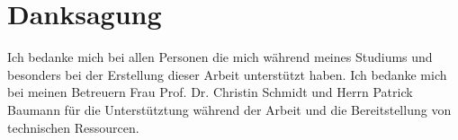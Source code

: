 \chapter*{Danksagung}
Ich bedanke mich bei allen Personen die mich während meines Studiums und besonders bei der Erstellung dieser Arbeit unterstützt haben.
Ich bedanke mich bei meinen Betreuern Frau Prof. Dr. Christin Schmidt und Herrn Patrick Baumann für die Unterstütztung während der Arbeit und
die Bereitstellung von technischen Ressourcen.